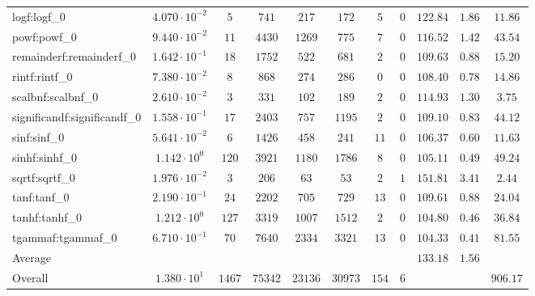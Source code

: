 \begin{tabular}{|l|c|c|c|c|c|c|c|c|c|c|}
logf:logf\_0                 & $ 4.070 \cdot 10^{-2} $ & $ 5      $ & $ 741   $ & $ 217   $ & $ 172   $ & $ 5   $ & $ 0 $ & $ 122.84      $ & $ 1.86    $ & $ 11.86   $ \\
powf:powf\_0                 & $ 9.440 \cdot 10^{-2} $ & $ 11     $ & $ 4430  $ & $ 1269  $ & $ 775   $ & $ 7   $ & $ 0 $ & $ 116.52      $ & $ 1.42    $ & $ 43.54   $ \\
remainderf:remainderf\_0     & $ 1.642 \cdot 10^{-1} $ & $ 18     $ & $ 1752  $ & $ 522   $ & $ 681   $ & $ 2   $ & $ 0 $ & $ 109.63      $ & $ 0.88    $ & $ 15.20   $ \\
rintf:rintf\_0               & $ 7.380 \cdot 10^{-2} $ & $ 8      $ & $ 868   $ & $ 274   $ & $ 286   $ & $ 0   $ & $ 0 $ & $ 108.40      $ & $ 0.78    $ & $ 14.86   $ \\
scalbnf:scalbnf\_0           & $ 2.610 \cdot 10^{-2} $ & $ 3      $ & $ 331   $ & $ 102   $ & $ 189   $ & $ 2   $ & $ 0 $ & $ 114.93      $ & $ 1.30    $ & $ 3.75    $ \\
significandf:significandf\_0 & $ 1.558 \cdot 10^{-1} $ & $ 17     $ & $ 2403  $ & $ 757   $ & $ 1195  $ & $ 2   $ & $ 0 $ & $ 109.10      $ & $ 0.83    $ & $ 44.12   $ \\
sinf:sinf\_0                 & $ 5.641 \cdot 10^{-2} $ & $ 6      $ & $ 1426  $ & $ 458   $ & $ 241   $ & $ 11  $ & $ 0 $ & $ 106.37      $ & $ 0.60    $ & $ 11.63   $ \\
sinhf:sinhf\_0               & $ 1.142 \cdot 10^{0}  $ & $ 120    $ & $ 3921  $ & $ 1180  $ & $ 1786  $ & $ 8   $ & $ 0 $ & $ 105.11      $ & $ 0.49    $ & $ 49.24   $ \\
sqrtf:sqrtf\_0               & $ 1.976 \cdot 10^{-2} $ & $ 3      $ & $ 206   $ & $ 63    $ & $ 53    $ & $ 2   $ & $ 1 $ & $ 151.81      $ & $ 3.41    $ & $ 2.44    $ \\
tanf:tanf\_0                 & $ 2.190 \cdot 10^{-1} $ & $ 24     $ & $ 2202  $ & $ 705   $ & $ 729   $ & $ 13  $ & $ 0 $ & $ 109.61      $ & $ 0.88    $ & $ 24.04   $ \\
tanhf:tanhf\_0               & $ 1.212 \cdot 10^{0}  $ & $ 127    $ & $ 3319  $ & $ 1007  $ & $ 1512  $ & $ 2   $ & $ 0 $ & $ 104.80      $ & $ 0.46    $ & $ 36.84   $ \\
tgammaf:tgammaf\_0           & $ 6.710 \cdot 10^{-1} $ & $ 70     $ & $ 7640  $ & $ 2334  $ & $ 3321  $ & $ 13  $ & $ 0 $ & $ 104.33      $ & $ 0.41    $ & $ 81.55   $ \\
\hline
Average                      & $                     $ & $        $ & $       $ & $       $ & $       $ & $     $ & $   $ & $ 133.18      $ & $ 1.56    $ & $         $ \\
\hline
Overall                      & $ 1.380 \cdot 10^{1}  $ & $ 1467   $ & $ 75342 $ & $ 23136 $ & $ 30973 $ & $ 154 $ & $ 6 $ & $             $ & $         $ & $ 906.17  $ \\
\hline
\end{tabular}
